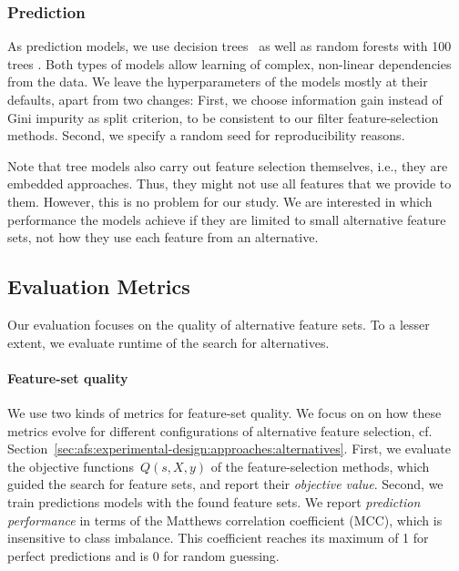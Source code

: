 \documentclass{article}
\theoremstyle{definition}
\begin{document}
\subsubsection{Prediction}
\label{sec:afs:experimental-design:approaches:prediction}

As prediction models, we use decision trees~\cite{breiman1984classification} as well as random forests with 100 trees \cite{breiman2001random}.
Both types of models allow learning of complex, non-linear dependencies from the data.
We leave the hyperparameters of the models mostly at their defaults, apart from two changes:
First, we choose information gain instead of Gini impurity as split criterion, to be consistent to our filter feature-selection methods.
Second, we specify a random seed for reproducibility reasons.

Note that tree models also carry out feature selection themselves, i.e., they are embedded approaches.
Thus, they might not use all features that we provide to them.
However, this is no problem for our study.
We are interested in which performance the models achieve if they are limited to small alternative feature sets, not how they use each feature from an alternative.

\subsection{Evaluation Metrics}
\label{sec:afs:experimental-design:evaluation}

Our evaluation focuses on the quality of alternative feature sets.
To a lesser extent, we evaluate runtime of the search for alternatives.

\paragraph{Feature-set quality}

We use two kinds of metrics for feature-set quality.
We focus on on how these metrics evolve for different configurations of alternative feature selection, cf. Section~\ref{sec:afs:experimental-design:approaches:alternatives}.
First, we evaluate the objective functions~$Q(s,X,y)$ of the feature-selection methods, which guided the search for feature sets, and report their \emph{objective value}.
Second, we train predictions models with the found feature sets.
We report \emph{prediction performance} in terms of the Matthews correlation coefficient (MCC), which is insensitive to class imbalance.
This coefficient reaches its maximum of 1 for perfect predictions and is 0 for random guessing.
\end{document}

